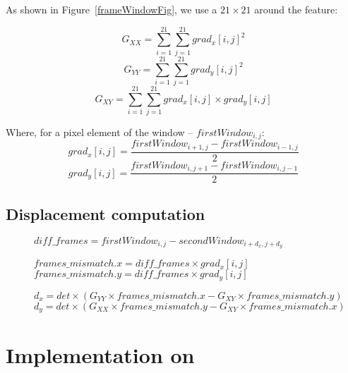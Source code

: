 As shown in Figure~\ref{frameWindowFig}, we use a $21\times21$  around the feature:

$$G_{XX} = \sum_{i=1}^{21}\sum_{j=1}^{21} grad_{x}[i,j]^{2}$$
$$G_{YY} = \sum_{i=1}^{21}\sum_{j=1}^{21} grad_{y}[i,j]^{2}$$
$$G_{XY} = \sum_{i=1}^{21}\sum_{j=1}^{21} grad_{x}[i,j]\times grad_{y}[i,j]$$

Where, for a pixel element of the window -- $firstWindow_{i,j}$:
$$grad_{x}[i,j] = \frac{firstWindow_{i+1,j} - firstWindow_{i-1,j}}{2}$$
$$grad_{y}[i,j] = \frac{firstWindow_{i,j+1} - firstWindow_{i,j-1}}{2}$$


\subsection{Displacement computation}

\begin{figure}[!htbp]
\begin{algorithmic}

	\State $diff\_frames = firstWindow_{i,j} - secondWindow_{i+d_{x},j+d_{y}}$

	\State $frames\_mismatch.x = diff\_frames\times grad_{x}[i,j]$
	\State $frames\_mismatch.y = diff\_frames\times grad_{y}[i,j]$

	\State $d_{x} = det\times (G_{YY}\times frames\_mismatch.x - G_{XY}\times frames\_mismatch.y)$
	\State $d_{y} = det\times (G_{XX}\times frames\_mismatch.y - G_{XY}\times frames\_mismatch.x)$

	\EndFor
\end{algorithmic}
\end{figure}


\section{Implementation on \vc}

